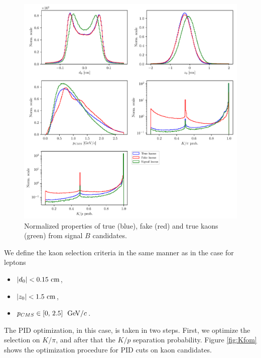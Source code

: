 \begin{figure}[H]
	\centering
	\includegraphics[width=\linewidth]{fig/FSP_kaon_vars}
	\captionsetup{width=.8\linewidth}
	\caption{Normalized properties of true (blue), fake (red) and true kaons (green) from signal $B$ candidates.}
	\label{fig:Kvars}
\end{figure}

We define the kaon selection criteria in the same manner as in the case for leptons
\begin{itemize}
	\item $\vert d_0 \vert < 0.15\mathrm{~cm}$,
	\item $\vert z_0 \vert < 1.5\mathrm{~cm}$,
	\item $p_{CMS} \in [0,\,2.5]~\mathrm{~GeV}/c$.
\end{itemize}

The PID optimization, in this case, is taken in two steps. First, we optimize the selection on $K / \pi$, and after that the $K/p$ separation probability. Figure \ref{fig:Kfom} shows the optimization procedure for PID cuts on kaon candidates.

